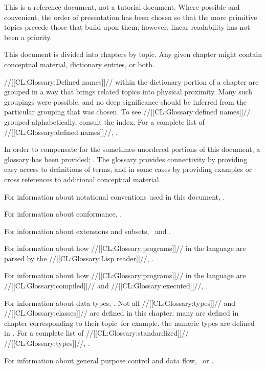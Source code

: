 


This is a reference document, not a tutorial document.  Where possible
and convenient, the order of presentation has been chosen so that the
more primitive topics precede those that build upon them;  however,
linear readability has not been a priority.

This document is divided into chapters by topic.
Any given chapter might contain conceptual material, dictionary entries, or both.

//[[CL:Glossary:Defined names]]// within the dictionary portion of a chapter are
grouped in a way that brings related topics into physical proximity.
Many such groupings were possible,
and no deep significance should be inferred from the particular grouping that was chosen.
To see //[[CL:Glossary:defined names]]// grouped alphabetically, consult the index.
For a complete list of //[[CL:Glossary:defined names]]//, \seesection\CLsymbols.

In order to compensate for the sometimes-unordered portions of this document, 
a glossary has been provided; \seechapter\Glossary.
The glossary provides connectivity by providing easy access to 
definitions of terms, and in some cases by providing examples or 
cross references to additional conceptual material.

For information about notational conventions used in this document,
\seesection\Definitions.

For information about conformance, \seesection\Conformance. 

For information about extensions and subsets, \seesection\LanguageExtensions\
and \secref\LanguageSubsets.

For information about how //[[CL:Glossary:programs]]// in the language are parsed by the
//[[CL:Glossary:Lisp reader]]//, \seechapter\Syntax.

For information about how //[[CL:Glossary:programs]]// in the language are //[[CL:Glossary:compiled]]//
and //[[CL:Glossary:executed]]//, \seechapter\EvaluationAndCompilation.

For information about data types, \seechapter\TypesAndClasses.
Not all //[[CL:Glossary:types]]// and //[[CL:Glossary:classes]]// are defined in this chapter;
many are defined in chapter corresponding to their topic--for example,
the numeric types are defined in \chapref\Numbers.
For a complete list of //[[CL:Glossary:standardized]]// //[[CL:Glossary:types]]//, 
\seefigure\StandardizedAtomicTypeSpecs.

For information about general purpose control and data flow,
\seechapter\DataAndControlFlow\ or \chapref\Iteration.


